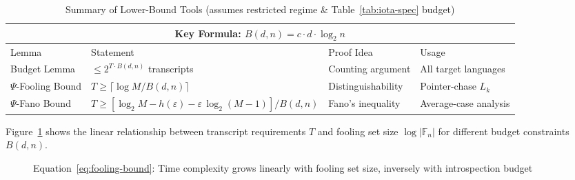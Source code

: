 \begin{table}[htbp]
\centering
\caption{Summary of Lower-Bound Tools (assumes restricted regime \& Table~\ref{tab:iota-spec} budget)}
\label{tab:lower-bound-summary}
\small
\begin{tabular}{@{}p{2.5cm}p{5.5cm}p{3cm}p{3.5cm}@{}}
\toprule
\multicolumn{4}{c}{\textbf{Key Formula: } $B(d,n) = c \cdot d \cdot \log_{2} n$} \\
\midrule
Lemma & Statement & Proof Idea & Usage \\
\midrule
Budget Lemma & $\leq 2^{T \cdot B(d,n)}$ transcripts & Counting argument & All target languages \\
$\Psi$-Fooling Bound & $T \geq \lceil \log M / B(d,n) \rceil$ & Distinguishability & Pointer-chase $L_k$ \\
$\Psi$-Fano Bound & $T \geq [\log_{2} M - h(\varepsilon) - \varepsilon \, \log_{2}(M-1)] / B(d,n)$ & Fano's inequality & Average-case analysis \\
\bottomrule
\end{tabular}
\end{table}

\begin{remark}[Visualization]
Figure~\ref{fig:bounds-visualization} shows the linear relationship between transcript requirements $T$ and fooling set size $\log|\mathbb{F}_n|$ for different budget constraints $B(d,n)$.
\end{remark}

\begin{figure}[htbp]
\centering
{}
\caption{Equation~\eqref{eq:fooling-bound}: Time complexity grows linearly with fooling set size, inversely with introspection budget}
\label{fig:bounds-visualization}
\end{figure}

